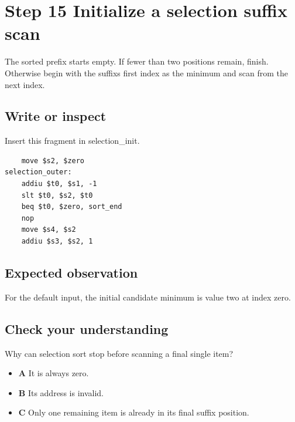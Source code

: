 \section{Step 15 Initialize a selection suffix
  scan}\label{009-sorting-visualizer-s15-step-15-initialize-a-selection-suffix-scan}

The sorted prefix starts empty. If fewer than two positions remain,
finish. Otherwise begin with the suffix\textquotesingle s first index as
the minimum and scan from the next index.

\subsection{Write or
  inspect}\label{009-sorting-visualizer-s15-write-or-inspect}

Insert this fragment in selection\_init.

\begin{verbatim}
    move $s2, $zero
selection_outer:
    addiu $t0, $s1, -1
    slt $t0, $s2, $t0
    beq $t0, $zero, sort_end
    nop
    move $s4, $s2
    addiu $s3, $s2, 1
\end{verbatim}

\subsection{Expected
  observation}\label{009-sorting-visualizer-s15-expected-observation}

For the default input, the initial candidate minimum is value two at
index zero.

\subsection{Check your
  understanding}\label{009-sorting-visualizer-s15-check-your-understanding}

Why can selection sort stop before scanning a final single item?

\begin{itemize}
  \tightlist
  \item
        \textbf{A} It is always zero.
  \item
        \textbf{B} Its address is invalid.
  \item
        \textbf{C} Only one remaining item is already in its final suffix
        position.
\end{itemize}
